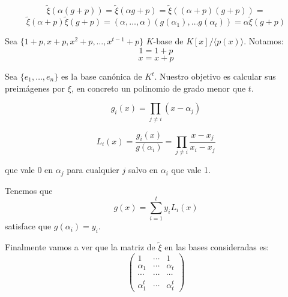 \[
  \tilde{\xi}(\alpha(g+p))=\tilde{\xi}(\alpha g+p)=\tilde{\xi}((\alpha
  + p)(g +p))=\]\[\tilde{\xi}(\alpha + p)\tilde{\xi}(g+p)=
  (\alpha,\ldots, \alpha)(g(\alpha_1),\ldots g(\alpha_t))=
  \alpha\tilde{\xi}(g+p)
\]

Sea \(\{1+p, x+p, x^2+p,\ldots, x^{t-1} +p\}\)
\(K\)-base de \(K[x]/\langle p(x)\rangle\).
Notamos:
\[ 1 = 1+p\]
\[ x = x+p\]

Sea \(\{e_1,\ldots, e_n\}\) es la base canónica de \(K^t\).
Nuestro objetivo es calcular sus preimágenes por \(\xi\), en concreto
un polinomio de grado menor que \(t\).

\[
  g_i(x)=\prod_{j\neq i}(x-\alpha_j)
\]

\[
  L_i(x)=\frac{g_i(x)}{g(\alpha_i)}=\prod_{j\neq i}\frac{x-x_j}{x_i-x_j}
\]

que vale 0 en \(\alpha_j\) para cualquier \(j\)
salvo en \(\alpha_i\) que vale 1.

Tenemos que
\[
  g(x)=\sum_{i=1}^t y_i L_i(x)
\]
satisface que \(g(\alpha_i)=y_i\).


Finalmente vamos a ver que la matriz de \(\tilde{\xi}\) en las bases
consideradas es:
\[
  \begin{pmatrix}
    1&\cdots& 1\\
    \alpha_1 &\cdots&\alpha_t\\
    \cdots&\cdots&\cdots\\
    \alpha_1^t&\cdots&\alpha_t^t
  \end{pmatrix}
\]
